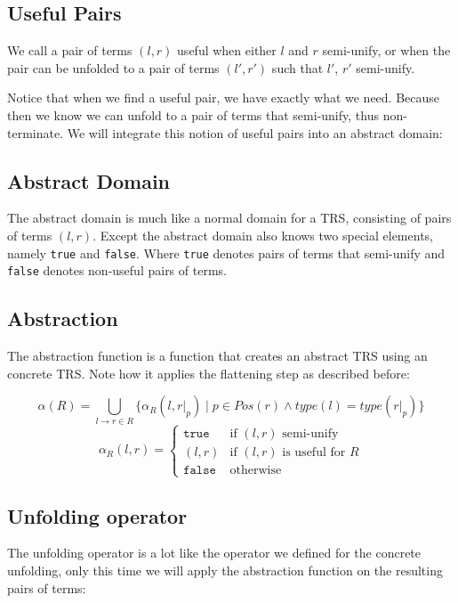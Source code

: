 \subsection*{Useful Pairs}
\begin{definition}
We call a pair of terms $(l, r)$ useful when either $l$ and $r$ semi-unify, or when the pair can be unfolded to a pair of terms $(l', r')$ such that $l'$, $r'$ semi-unify.
\end{definition}
Notice that when we find a useful pair, we have exactly what we need. Because then we know we can unfold to a pair of terms that semi-unify, thus non-terminate. We will integrate this notion of useful pairs into an abstract domain:

\subsection*{Abstract Domain}
The abstract domain is much like a normal domain for a TRS, consisting of pairs of terms $(l, r)$. Except the abstract domain also knows two special elements, namely \texttt{true} and \texttt{false}. Where \texttt{true} denotes pairs of terms that semi-unify and \texttt{false} denotes non-useful pairs of terms.

\subsection*{Abstraction}
The abstraction function is a function that creates an abstract TRS using an concrete TRS. Note how it applies the flattening step as described before: \begin{definition}
\label{def:abstraction}
\[
\alpha(R) = \bigcup\limits_{l \rightarrow r \in R} \{\alpha_R(l, \left.r\right|_p) \mid p \in \textit{Pos}(r) \land \textit{type}(l) = \textit{type}(\left.r\right|_p)\} 
\]
\[
\alpha_R(l, r) =
\left\{
    \begin{array}{ll}
        \texttt{true} & \text{if } (l, r) \text{ semi-unify}\\
        (l, r) & \text{if } (l, r) \text{ is useful for } R\\
        \texttt{false} & \text{otherwise}
    \end{array}
\right.
\]
\end{definition}

\subsection*{Unfolding operator}
The unfolding operator is a lot like the operator we defined for the concrete unfolding, only this time we will apply the abstraction function on the resulting pairs of terms:

